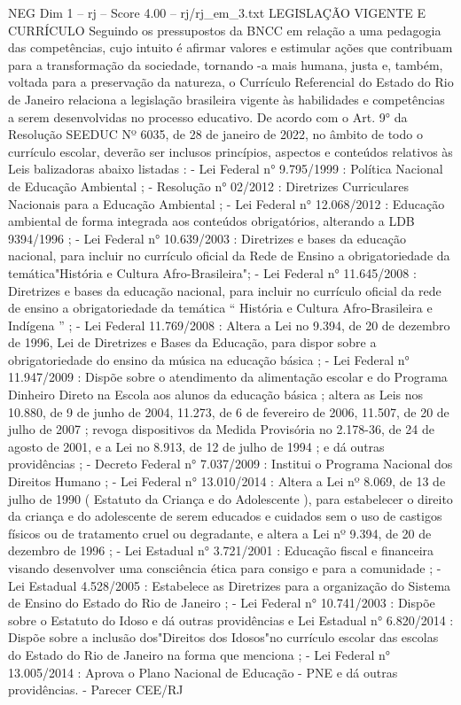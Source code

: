 \begin{textsample}{NEG Dim 1 – rj – Score 4.00 – rj/rj\_em\_3.txt}  \label{ex:f1_neg_008}
LEGISLAÇÃO VIGENTE E CURRÍCULO Seguindo os pressupostos da BNCC em relação a uma pedagogia das competências, cujo intuito é afirmar valores e estimular ações que contribuam para a transformação da sociedade, tornando -a mais humana, justa e, também, voltada para a preservação da natureza, o Currículo Referencial do Estado do Rio de Janeiro relaciona a legislação brasileira vigente às habilidades e competências a serem desenvolvidas no processo educativo.
De acordo com o Art. 9{\EmojiFont °} da Resolução SEEDUC Nº 6035, de 28 de janeiro de 2022, no âmbito de todo o currículo escolar, deverão ser inclusos princípios, aspectos e conteúdos relativos às Leis balizadoras abaixo listadas : - Lei Federal n{\EmojiFont °} 9.795/1999 : Política Nacional de Educação Ambiental ; - Resolução n{\EmojiFont °} 02/2012 : Diretrizes Curriculares Nacionais para a Educação Ambiental ; - Lei Federal n{\EmojiFont °} 12.068/2012 : Educação ambiental de forma integrada aos conteúdos obrigatórios, alterando a LDB 9394/1996 ; - Lei Federal n{\EmojiFont °} 10.639/2003 : Diretrizes e bases da educação nacional, para incluir no currículo oficial da Rede de Ensino a obrigatoriedade da temática"História e Cultura Afro-Brasileira"; - Lei Federal n{\EmojiFont °} 11.645/2008 : Diretrizes e bases da educação nacional, para incluir no currículo oficial da rede de ensino a obrigatoriedade da temática “ História e Cultura Afro-Brasileira e Indígena ” ; - Lei Federal 11.769/2008 : Altera a Lei no 9.394, de 20 de dezembro de 1996, Lei de Diretrizes e Bases da Educação, para dispor sobre a obrigatoriedade do ensino da música na educação básica ; - Lei Federal n{\EmojiFont °} 11.947/2009 : Dispõe sobre o atendimento da alimentação escolar e do Programa Dinheiro Direto na Escola aos alunos da educação básica ; altera as Leis nos 10.880, de 9 de junho de 2004, 11.273, de 6 de fevereiro de 2006, 11.507, de 20 de julho de 2007 ; revoga dispositivos da Medida Provisória no 2.178-36, de 24 de agosto de 2001, e a Lei no 8.913, de 12 de julho de 1994 ; e dá outras providências ; - Decreto Federal n{\EmojiFont °} 7.037/2009 : Institui o Programa Nacional dos Direitos Humano ; - Lei Federal n{\EmojiFont °} 13.010/2014 : Altera a Lei nº 8.069, de 13 de julho de 1990 ( Estatuto da Criança e do Adolescente ), para estabelecer o direito da criança e do adolescente de serem educados e cuidados sem o uso de castigos físicos ou de tratamento cruel ou degradante, e altera a Lei nº 9.394, de 20 de dezembro de 1996 ; - Lei Estadual n{\EmojiFont °} 3.721/2001 : Educação fiscal e financeira visando desenvolver uma consciência ética para consigo e para a comunidade ; - Lei Estadual 4.528/2005 : Estabelece as Diretrizes para a organização do Sistema de Ensino do Estado do Rio de Janeiro ; - Lei Federal n{\EmojiFont °} 10.741/2003 : Dispõe sobre o Estatuto do Idoso e dá outras providências e Lei Estadual n{\EmojiFont °} 6.820/2014 : Dispõe sobre a inclusão dos"Direitos dos Idosos"no currículo escolar das escolas do Estado do Rio de Janeiro na forma que menciona ; - Lei Federal n{\EmojiFont °} 13.005/2014 : Aprova o Plano Nacional de Educação - PNE e dá outras providências. - Parecer CEE/RJ 
\end{textsample}
